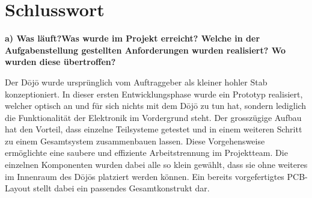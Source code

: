 \section{Schlusswort} \label{sec:schlusswort}

\textbf{a) Was läuft?Was wurde im Projekt erreicht? Welche in der Aufgabenstellung gestellten Anforderungen wurden realisiert? Wo wurden diese übertroffen?}

Der Dōjō wurde ursprünglich vom Auftraggeber als kleiner hohler Stab konzeptioniert. In dieser ersten Entwicklungsphase wurde ein Prototyp realisiert, welcher optisch an und für sich nichts mit dem Dōjō zu tun hat, sondern lediglich die Funktionalität der Elektronik im Vordergrund steht. Der grosszügige Aufbau hat den Vorteil, dass einzelne Teilsysteme getestet und in einem weiteren Schritt zu einem Gesamtsystem zusammenbauen lassen. Diese Vorgehensweise ermöglichte eine saubere und effiziente Arbeitstrennung im Projektteam. Die einzelnen Komponenten wurden dabei alle so klein gewählt, dass sie ohne weiteres im Innenraum des Dōjōs platziert werden können. Ein bereits vorgefertigtes PCB-Layout stellt dabei ein passendes Gesamtkonstrukt dar.

